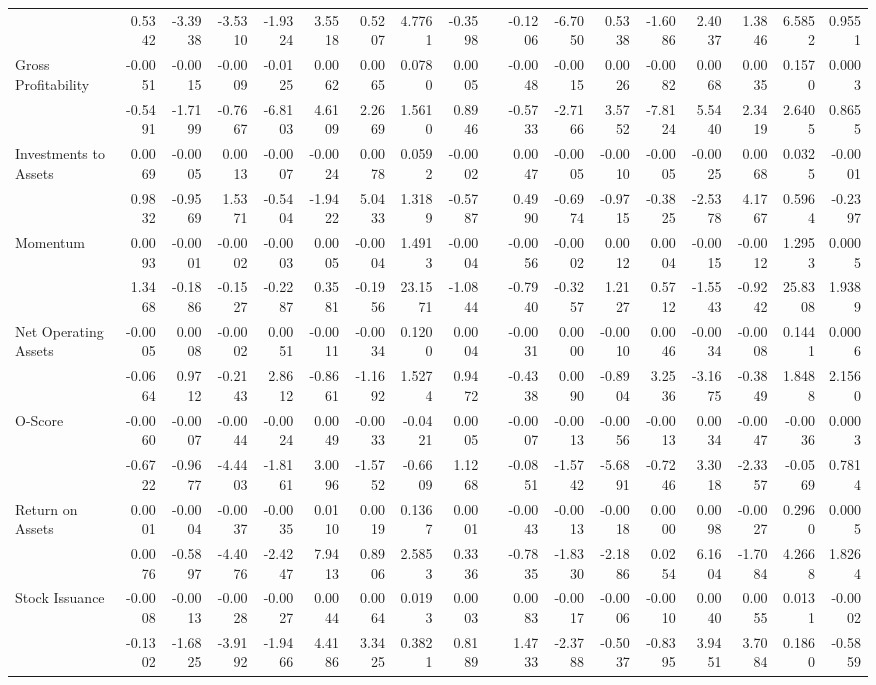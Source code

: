 \begin{table}[h]
{\begin{tabular}{lrrrrrrrrrrrrrrrrr}
& 0.5342 & -3.3938 & -3.5310 & -1.9324 & 3.5518 & 0.5207 & 4.7761 & -0.3598 &       & -0.1206 & -6.7050 & 0.5338 & -1.6086 & 2.4037 & 1.3846 & 6.5852 & 0.9551 \\
Gross Profitability & -0.0051 & -0.0015 & -0.0009 & -0.0125 & 0.0062 & 0.0065 & 0.0780 & 0.0005 &       & -0.0048 & -0.0015 & 0.0026 & -0.0082 & 0.0068 & 0.0035 & 0.1570 & 0.0003 \\
& -0.5491 & -1.7199 & -0.7667 & -6.8103 & 4.6109 & 2.2669 & 1.5610 & 0.8946 &       & -0.5733 & -2.7166 & 3.5752 & -7.8124 & 5.5440 & 2.3419 & 2.6405 & 0.8655 \\
Investments to Assets & 0.0069 & -0.0005 & 0.0013 & -0.0007 & -0.0024 & 0.0078 & 0.0592 & -0.0002 &       & 0.0047 & -0.0005 & -0.0010 & -0.0005 & -0.0025 & 0.0068 & 0.0325 & -0.0001 \\
& 0.9832 & -0.9569 & 1.5371 & -0.5404 & -1.9422 & 5.0433 & 1.3189 & -0.5787 &       & 0.4990 & -0.6974 & -0.9715 & -0.3825 & -2.5378 & 4.1767 & 0.5964 & -0.2397 \\
Momentum & 0.0093 & -0.0001 & -0.0002 & -0.0003 & 0.0005 & -0.0004 & 1.4913 & -0.0004 &       & -0.0056 & -0.0002 & 0.0012 & 0.0004 & -0.0015 & -0.0012 & 1.2953 & 0.0005 \\
& 1.3468 & -0.1886 & -0.1527 & -0.2287 & 0.3581 & -0.1956 & 23.1571 & -1.0844 &       & -0.7940 & -0.3257 & 1.2127 & 0.5712 & -1.5543 & -0.9242 & 25.8308 & 1.9389 \\
Net Operating Assets & -0.0005 & 0.0008 & -0.0002 & 0.0051 & -0.0011 & -0.0034 & 0.1200 & 0.0004 &       & -0.0031 & 0.0000 & -0.0010 & 0.0046 & -0.0034 & -0.0008 & 0.1441 & 0.0006 \\
& -0.0664 & 0.9712 & -0.2143 & 2.8612 & -0.8661 & -1.1692 & 1.5274 & 0.9472 &       & -0.4338 & 0.0090 & -0.8904 & 3.2536 & -3.1675 & -0.3849 & 1.8488 & 2.1560 \\
O-Score & -0.0060 & -0.0007 & -0.0044 & -0.0024 & 0.0049 & -0.0033 & -0.0421 & 0.0005 &       & -0.0007 & -0.0013 & -0.0056 & -0.0013 & 0.0034 & -0.0047 & -0.0036 & 0.0003 \\
& -0.6722 & -0.9677 & -4.4403 & -1.8161 & 3.0096 & -1.5752 & -0.6609 & 1.1268 &       & -0.0851 & -1.5742 & -5.6891 & -0.7246 & 3.3018 & -2.3357 & -0.0569 & 0.7814 \\
Return on Assets & 0.0001 & -0.0004 & -0.0037 & -0.0035 & 0.0110 & 0.0019 & 0.1367 & 0.0001 &       & -0.0043 & -0.0013 & -0.0018 & 0.0000 & 0.0098 & -0.0027 & 0.2960 & 0.0005 \\
& 0.0076 & -0.5897 & -4.4076 & -2.4247 & 7.9413 & 0.8906 & 2.5853 & 0.3336 &       & -0.7835 & -1.8330 & -2.1886 & 0.0254 & 6.1604 & -1.7084 & 4.2668 & 1.8264 \\
Stock Issuance & -0.0008 & -0.0013 & -0.0028 & -0.0027 & 0.0044 & 0.0064 & 0.0193 & 0.0003 &       & 0.0083 & -0.0017 & -0.0006 & -0.0010 & 0.0040 & 0.0055 & 0.0131 & -0.0002 \\
& -0.1302 & -1.6825 & -3.9192 & -1.9466 & 4.4186 & 3.3425 & 0.3821 & 0.8189 &       & 1.4733 & -2.3788 & -0.5037 & -0.8395 & 3.9451 & 3.7084 & 0.1860 & -0.5859 \\
\bottomrule
\end{tabular}%
}
\label{tab:liq-ff6v}%
\end{table}%
